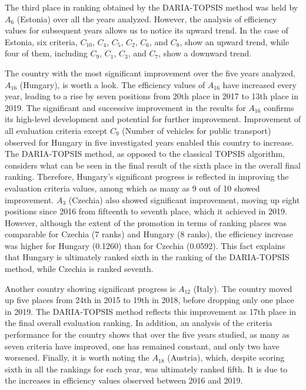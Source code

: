 \documentclass[final,5p,times,twocolumn,authoryear]{elsarticle}
\begin{document}
The third place in ranking obtained by the DARIA-TOPSIS method was held by $A_{6}$ (Estonia) over all the years analyzed. However, the analysis of efficiency values for subsequent years allows us to notice its upward trend. In the case of Estonia, six criteria, $C_{10}$, $C_{4}$, $C_{5}$, $C_{2}$, $C_{6}$, and $C_{8}$, show an upward trend, while four of them, including $C_{9}$, $C_{1}$, $C_{3}$, and $C_{7}$, show a downward trend.

The country with the most significant improvement over the five years analyzed, $A_{16}$ (Hungary), is worth a look. The efficiency values of $A_{16}$ have increased every year, leading to a rise by seven positions from 20th place in 2017 to 13th place in 2019. The significant and successive improvement in the results for $A_{16}$ confirms its high-level development and potential for further improvement. Improvement of all evaluation criteria except $C_{9}$ (Number of vehicles for public transport) observed for Hungary in five investigated years enabled this country to increase. The DARIA-TOPSIS method, as opposed to the classical TOPSIS algorithm, considers what can be seen in the final result of the sixth place in the overall final ranking. Therefore, Hungary's significant progress is reflected in improving the evaluation criteria values, among which as many as 9 out of 10 showed improvement. $A_{3}$ (Czechia) also showed significant improvement, moving up eight positions since 2016 from fifteenth to seventh place, which it achieved in 2019. However, although the extent of the promotion in terms of ranking places was comparable for Czechia (7 ranks) and Hungary (8 ranks), the efficiency increase was higher for Hungary (0.1260) than for Czechia (0.0592). This fact explains that Hungary is ultimately ranked sixth in the ranking of the DARIA-TOPSIS method, while Czechia is ranked seventh.

Another country showing significant progress is $A_{12}$ (Italy). The country moved up five places from 24th in 2015 to 19th in 2018, before dropping only one place in 2019. The DARIA-TOPSIS method reflects this improvement as 17th place in the final overall evaluation ranking. In addition, an analysis of the criteria performance for the country shows that over the five years studied, as many as seven criteria have improved, one has remained constant, and only two have worsened. Finally, it is worth noting the $A_{18}$ (Austria), which, despite scoring sixth in all the rankings for each year, was ultimately ranked fifth. It is due to the increases in efficiency values observed between 2016 and 2019.
\end{document}
